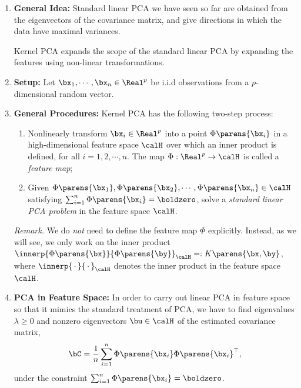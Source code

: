 \documentclass[12pt]{article}
\begin{document}
\begin{enumerate}[label=\textbf{\arabic*.}]
	
	\item \textbf{General Idea:} Standard linear PCA we have seen so far are obtained from the eigenvectors of the covariance matrix, and give directions in which the data have maximal variances. 
	
	Kernel PCA expands the scope of the standard linear PCA by expanding the features using non-linear transformations. 
	
	\item \textbf{Setup:} Let $\bx_1, \cdots, \bx_n \in \Real^p$ be i.i.d observations from a $p$-dimensional random vector. 
	
	\item \textbf{General Procedures:} Kernel PCA has the following two-step process: 
	\begin{enumerate}
		\item Nonlinearly transform $\bx_i \in \Real^p$ into a point $\Phi \parens{\bx_i}$ in a high-dimensional feature space $\calH$ over which an inner product is defined, for all $i = 1, 2, \cdots, n$. The map $\Phi: \Real^p \to \calH$ is called a \emph{feature map}; 
		\item Given $\Phi \parens{\bx_1}, \Phi \parens{\bx_2}, \cdots, \Phi \parens{\bx_n} \in \calH$ satisfying $\sum_{i=1}^n \Phi \parens{\bx_i} = \boldzero$, solve a \emph{standard linear PCA problem} in the feature space $\calH$. 
	\end{enumerate}
	
	\textit{Remark.} We do \emph{not} need to define the feature map $\Phi$ explicitly. Instead, as we will see, we only work on the inner product $\innerp{\Phi \parens{\bx}}{\Phi \parens{\by}}_{\calH} =: K \parens{\bx, \by}$, where $\innerp{\,\cdot\,}{\,\cdot\,}_{\calH}$ denotes the inner product in the feature space $\calH$. 
	
	\item \textbf{PCA in Feature Space:} In order to carry out linear PCA in feature space so that it mimics the standard treatment of PCA, we have to find eigenvalues $\lambda \ge 0$ and nonzero eigenvectors $\bu \in \calH$ of the estimated covariance matrix, 
	\begin{align*}
		\bC = \frac{1}{n} \sum_{i=1}^n \Phi \parens{\bx_i} \Phi \parens{\bx_i}^\top, 
	\end{align*}
	under the constraint $\sum_{i=1}^n \Phi \parens{\bx_i} = \boldzero$. 
	

\end{enumerate}
\end{document}
